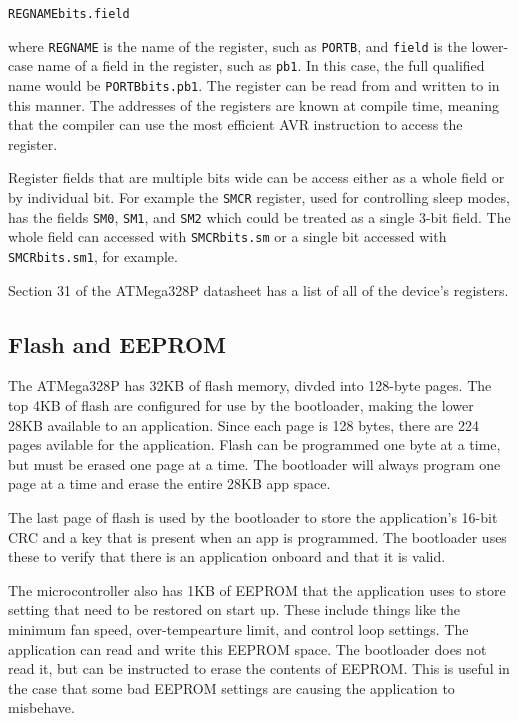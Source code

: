 \documentclass{article}
\begin{document}
\texttt{REGNAMEbits.field}

where \texttt{REGNAME} is the name of the register, such as \texttt{PORTB}, and \texttt{field} is the
lower-case name of a field in the register, such as \texttt{pb1}.  In this case, the full qualified
name would be \texttt{PORTBbits.pb1}.  The register can be read from and written to in this manner.
The addresses of the registers are known at compile time, meaning that the compiler can use the most
efficient AVR instruction to access the register.

Register fields that are multiple bits wide can be access either as a whole field or by individual
bit.  For example the \texttt{SMCR} register, used for controlling sleep modes, has the fields
\texttt{SM0}, \texttt{SM1}, and \texttt{SM2} which could be treated as a single 3-bit field.  The
whole field can accessed with \texttt{SMCRbits.sm} or a single bit accessed with
\texttt{SMCRbits.sm1}, for example.

Section 31 of the ATMega328P datasheet has a list of all of the device's registers.

\subsection{Flash and EEPROM} \label{ssec:FWflasheeprom}
The ATMega328P has 32KB of flash memory, divded into 128-byte pages.  The top 4KB of flash are
configured for use by the bootloader, making the lower 28KB available to an application.  Since each
page is 128 bytes, there are 224 pages avilable for the application.  Flash can be programmed one
byte at a time, but must be erased one page at a time.  The bootloader will always program one page
at a time and erase the entire 28KB app space.

The last page of flash is used by the bootloader to store the application's 16-bit CRC and a key
that is present when an app is programmed.  The bootloader uses these to verify that there is an
application onboard and that it is valid.

The microcontroller also has 1KB of EEPROM that the application uses to store setting that need to
be restored on start up.  These include things like the minimum fan speed, over-tempearture limit,
and control loop settings.  The application can read and write this EEPROM space.  The bootloader
does not read it, but can be instructed to erase the contents of EEPROM.  This is useful in the case
that some bad EEPROM settings are causing the application to misbehave.
\end{document}
